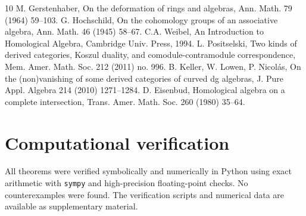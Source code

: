\documentclass[11pt,a4paper]{article}
\theoremstyle{plain}
\theoremstyle{definition}
\theoremstyle{remark}
\begin{document}
	\begin{thebibliography}{10}
		 M. Gerstenhaber, On the deformation of rings and algebras, Ann. Math. 79 (1964) 59--103.
		 G. Hochschild, On the cohomology groups of an associative algebra, Ann. Math. 46 (1945) 58--67.
		 C.A. Weibel, An Introduction to Homological Algebra, Cambridge Univ. Press, 1994.
		 L. Positselski, Two kinds of derived categories, Koszul duality, and comodule-contramodule correspondence, Mem. Amer. Math. Soc. 212 (2011) no. 996.
		 B. Keller, W. Lowen, P. Nicol\'as, On the (non)vanishing of some derived categories of curved dg algebras, J. Pure Appl. Algebra 214 (2010) 1271--1284.
		 D. Eisenbud, Homological algebra on a complete intersection, Trans. Amer. Math. Soc. 260 (1980) 35--64.
	\end{thebibliography}
	
	\appendix
	\section{Computational verification}
	\label{app:verification}
	All theorems were verified symbolically and numerically in Python using exact arithmetic with \texttt{sympy} and high-precision floating-point checks. No counterexamples were found. The verification scripts and numerical data are available as supplementary material.
\end{document}
